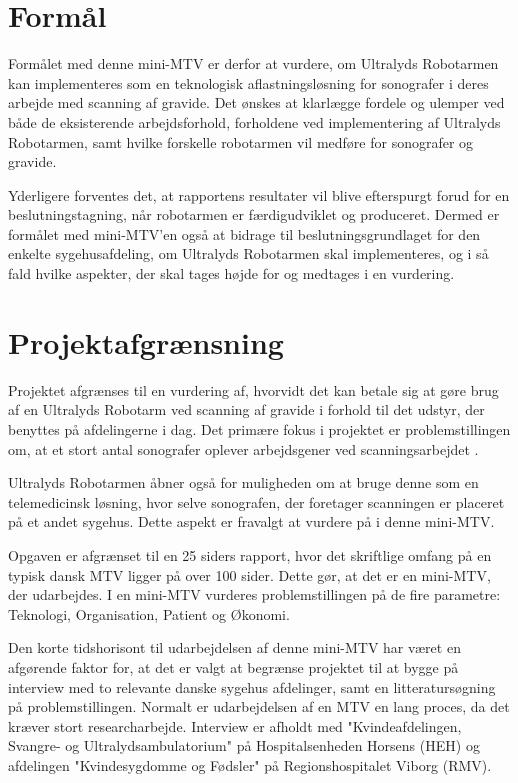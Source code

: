 
\section{Formål}
Formålet med denne mini-MTV er derfor at vurdere, om Ultralyds Robotarmen kan implementeres som en teknologisk aflastningsløsning for sonografer i deres arbejde med scanning af gravide. Det ønskes at klarlægge fordele og ulemper ved både de eksisterende arbejdsforhold, forholdene ved implementering af Ultralyds Robotarmen, samt hvilke forskelle robotarmen vil medføre for sonografer og gravide.

Yderligere forventes det, at rapportens resultater vil blive efterspurgt forud for en beslutningstagning, når robotarmen er færdigudviklet og produceret. Dermed er formålet med mini-MTV’en også at bidrage til beslutningsgrundlaget for den enkelte sygehusafdeling, om Ultralyds Robotarmen skal implementeres, og i så fald hvilke aspekter, der skal tages højde for og medtages i en vurdering.

\section{Projektafgrænsning}
Projektet afgrænses til en vurdering af, hvorvidt det kan betale sig at gøre brug af en Ultralyds Robotarm ved scanning af gravide i forhold til det udstyr, der benyttes på afdelingerne i dag. Det primære fokus i projektet er problemstillingen om, at et stort antal sonografer oplever arbejdsgener ved scanningsarbejdet \cite{31}\cite{30}\citep{24}\cite{36}. 

Ultralyds Robotarmen åbner også for muligheden om at bruge denne som en telemedicinsk løsning, hvor selve sonografen, der foretager scanningen er placeret på et andet sygehus. Dette aspekt er fravalgt at vurdere på i denne mini-MTV. 

Opgaven er afgrænset til en 25 siders rapport, hvor det skriftlige omfang på en typisk dansk MTV ligger på over 100 sider. Dette gør, at det er en mini-MTV, der udarbejdes. I en mini-MTV vurderes problemstillingen på de fire parametre: Teknologi, Organisation, Patient og Økonomi. 

Den korte tidshorisont til udarbejdelsen af denne mini-MTV har været en afgørende faktor for, at det er valgt at begrænse projektet til at bygge på interview med to relevante danske sygehus afdelinger, samt en litteratursøgning på problemstillingen. Normalt er udarbejdelsen af en MTV en lang proces, da det kræver stort researcharbejde. Interview er afholdt med "Kvindeafdelingen, Svangre- og Ultralydsambulatorium" på Hospitalsenheden Horsens (HEH) og afdelingen "Kvindesygdomme og Fødsler" på Regionshospitalet Viborg (RMV).


